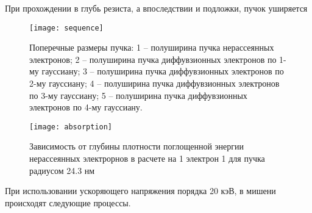 При прохождении в глубь резиста, а впоследствии и подложки, пучок уширяется
\begin{figure}[h]
    \center
    \texttt{[image: sequence]}
    \caption{Поперечные размеры пучка:
1 -- полуширина пучка нерассеянных электронов;
2 -- полуширина пучка диффувзионных электронов по 1-му гауссиану;
3 -- полуширина пучка диффувзионных электронов по 2-му гауссиану;
4 -- полуширина пучка диффувзионных электронов по 3-му гауссиану;
5 -- полуширина пучка диффувзионных электронов по 4-му гауссиану.}
    \label{fig:sequence}
\end{figure}


\begin{figure}[h]
    \center
    \texttt{[image: absorption]}
    \caption{Зависимость от глубины плотности поглощенной энергии нерассеянных электрорнов в расчете на 1 электрон 1 для пучка радиусом 24.3 нм}
    \label{fig:absorption}
\end{figure}

При использовании ускоряющего напряжения порядка 20 кэВ, в мишени происходят следующие процессы.


